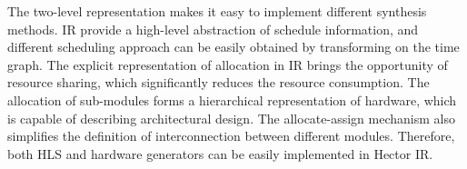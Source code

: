 The two-level representation makes it easy to implement different synthesis methods. \tor IR provide a high-level abstraction of schedule information, and different scheduling approach can be easily obtained by transforming on the time graph. The explicit representation of allocation in \hec IR brings the opportunity of resource sharing, which significantly reduces the resource consumption. The allocation of sub-modules forms a hierarchical representation of hardware, which is capable of describing architectural design. The allocate-assign mechanism also simplifies the definition of interconnection between different modules. Therefore, both HLS and hardware generators can be easily implemented in Hector IR.

